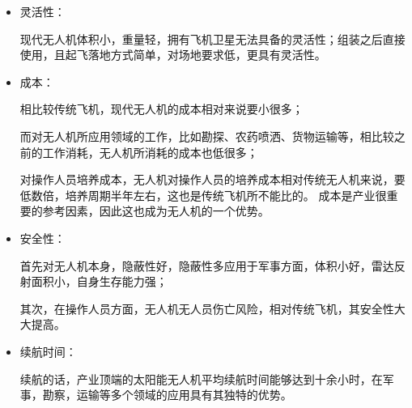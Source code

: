 \documentclass{article}
\begin{document}
\begin{itemize}

    \item 灵活性：\par
现代无人机体积小，重量轻，拥有飞机卫星无法具备的灵活性；组装之后直接使用，且起飞落地方式简单，对场地要求低，更具有灵活性。\par
    \item 成本：\par
相比较传统飞机，现代无人机的成本相对来说要小很多；\par
而对无人机所应用领域的工作，比如勘探、农药喷洒、货物运输等，相比较之前的工作消耗，无人机所消耗的成本也低很多；\par
对操作人员培养成本，无人机对操作人员的培养成本相对传统无人机来说，要低数倍，培养周期半年左右，这也是传统飞机所不能比的。
成本是产业很重要的参考因素，因此这也成为无人机的一个优势。\par
    \item 安全性：\par
首先对无人机本身，隐蔽性好，隐蔽性多应用于军事方面，体积小好，雷达反射面积小，自身生存能力强；\par
其次，在操作人员方面，无人机无人员伤亡风险，相对传统飞机，其安全性大大提高。\par
    \item 续航时间：\par\citep{6}
续航的话，产业顶端的太阳能无人机平均续航时间能够达到十余小时，在军事，勘察，运输等多个领域的应用具有其独特的优势。\par

\end{itemize}
\end{document}
